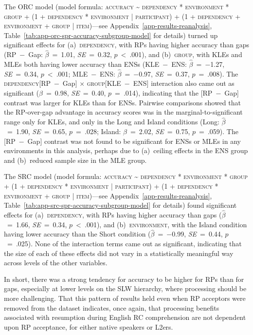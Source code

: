 The ORC model (model formula: \textsc{accuracy \~{} dependency * environment * group + (1 + dependency * environment | participant) + (1 + dependency + environment + group | item)}---see Appendix~\ref{app-results-reanalysis}, Table~\ref{tab:app-orc-spr-accuracy-subgroup-model} for details) turned up significant effects for (a)~\textsc{dependency}, with RPs having higher accuracy than gaps (RP~−~Gap: $\hat{\beta}$~=~1.01, \textit{SE}~=~0.32, $p$~<~.001), and (b)~\textsc{group}, with KLEs and MLEs both having lower accuracy than ENSs (KLE~−~ENS: $\hat{\beta}$~=~−1.27, \textit{SE}~=~0.34, $p$~<~.001; MLE~−~ENS: $\hat{\beta}$~=~−0.97, \textit{SE}~=~0.37, $p$~=~.008). The \textsc{dependency}[RP~−~Gap] × \textsc{group}[KLE~−~ENS] interaction also came out as significant ($\hat{\beta}$~=~0.98, \textit{SE}~=~0.40, $p$~=~.014), indicating that the [RP~−~Gap] contrast was larger for KLEs than for ENSs. Pairwise comparisons showed that the RP-over-gap advantage in accuracy scores was in the marginal-to-significant range only for KLEs, and only in the Long and Island conditions (Long: $\hat{\beta}$~=~1.90, \textit{SE}~=~0.65, $p$~=~.028; Island: $\hat{\beta}$~=~2.02, \textit{SE}~=~0.75, $p$~=~.059). The [RP~−~Gap] contrast was not found to be significant for ENSs or MLEs in any environments in this analysis, perhaps due to (a)~ceiling effects in the ENS group and (b)~reduced sample size in the MLE group.

The SRC model (model formula: \textsc{accuracy \~{} dependency * environment * group + (1 + dependency * environment | participant) + (1 + dependency * environment + group | item)}---see Appendix~\ref{app-results-reanalysis}, Table~\ref{tab:app-src-spr-accuracy-subgroup-model} for details) found significant effects for (a)~\textsc{dependency}, with RPs having higher accuracy than gaps ($\hat{\beta}$~=~1.66, \textit{SE}~=~0.34, $p$~<~.001), and (b)~\textsc{environment}, with the Island condition having lower accuracy than the Short condition ($\hat{\beta}$~=~−0.99, \textit{SE}~=~0.44, $p$~=~.025). None of the interaction terms came out as significant, indicating that the size of each of these effects did not vary in a statistically meaningful way across levels of the other variables.

In short, there was a strong tendency for accuracy to be higher for RPs than for gaps, especially at lower levels on the SLW hierarchy, where processing should be more challenging. That this pattern of results held even when RP acceptors were removed from the dataset indicates, once again, that processing benefits associated with resumption during English RC comprehension are not dependent upon RP acceptance, for either native speakers or L2ers.

